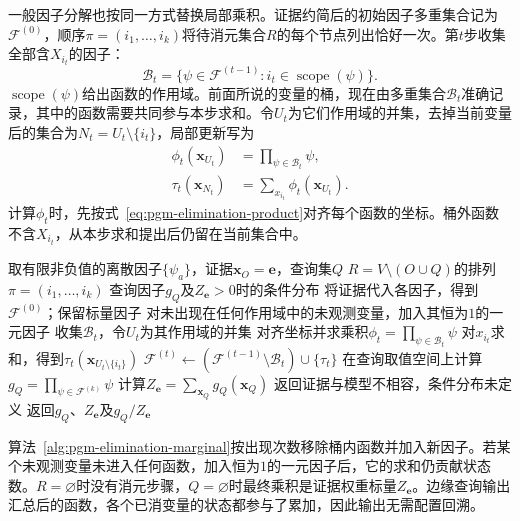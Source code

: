 一般因子分解也按同一方式替换局部乘积。证据约简后的初始因子多重集合记为$\mathcal{F}^{(0)}$，顺序$\pi=(i_1,\ldots,i_k)$将待消元集合$R$的每个节点列出恰好一次。第$t$步收集全部含$X_{i_t}$的因子：
\[
  \mathcal{B}_t
  =\{\psi\in\mathcal{F}^{(t-1)}:
      i_t\in\operatorname{scope}(\psi)\}.
\]
$\operatorname{scope}(\psi)$给出函数的作用域。前面所说的变量的桶，现在由多重集合$\mathcal{B}_t$准确记录，其中的函数需要共同参与本步求和。令$U_t$为它们作用域的并集，去掉当前变量后的集合为$N_t=U_t\setminus\{i_t\}$，局部更新写为
\begin{equation}
  \begin{aligned}
    \phi_t(\bm{x}_{U_t})&=\prod_{\psi\in\mathcal{B}_t}\psi,\\
    \tau_t(\bm{x}_{N_t})&=\sum_{x_{i_t}}\phi_t(\bm{x}_{U_t}).
  \end{aligned}
  \label{eq:pgm-elimination-local-sum}
\end{equation}
计算$\phi_t$时，先按式~\eqref{eq:pgm-elimination-product}对齐每个函数的坐标。桶外函数不含$X_{i_t}$，从本步求和提出后仍留在当前集合中。

\begin{algorithm}[离散边缘概率的变量消除]
  \label{alg:pgm-elimination-marginal}
  \begin{algorithmic}[1]
    \Require 取有限非负值的离散因子$\{\psi_a\}$，证据$\bm{x}_O=\bm{e}$，查询集$Q$
    \Require $R=V\setminus(O\cup Q)$的排列$\pi=(i_1,\ldots,i_k)$
    \Ensure 查询因子$g_Q$及$Z_{\bm{e}}>0$时的条件分布
    \State 将证据代入各因子，得到$\mathcal{F}^{(0)}$；保留标量因子
    \State 对未出现在任何作用域中的未观测变量，加入其恒为$1$的一元因子
      \State 收集$\mathcal{B}_t$，令$U_t$为其作用域的并集
      \State 对齐坐标并求乘积$\phi_t=\prod_{\psi\in\mathcal{B}_t}\psi$
      \State 对$x_{i_t}$求和，得到$\tau_t(\bm{x}_{U_t\setminus\{i_t\}})$
      \State $\mathcal{F}^{(t)}\gets
        (\mathcal{F}^{(t-1)}\setminus\mathcal{B}_t)\cup\{\tau_t\}$
    \EndFor
    \State 在查询取值空间上计算$g_Q=\prod_{\psi\in\mathcal{F}^{(k)}}\psi$
    \State 计算$Z_{\bm{e}}=\sum_{\bm{x}_Q}g_Q(\bm{x}_Q)$
      \State 返回证据与模型不相容，条件分布未定义
    \Else
      \State 返回$g_Q$、$Z_{\bm{e}}$及$g_Q/Z_{\bm{e}}$
    \EndIf
  \end{algorithmic}
\end{algorithm}

算法~\ref{alg:pgm-elimination-marginal}按出现次数移除桶内函数并加入新因子。若某个未观测变量未进入任何函数，加入恒为$1$的一元因子后，它的求和仍贡献状态数。$R=\varnothing$时没有消元步骤，$Q=\varnothing$时最终乘积是证据权重标量$Z_{\bm{e}}$。边缘查询输出汇总后的函数，各个已消变量的状态都参与了累加，因此输出无需配置回溯。

